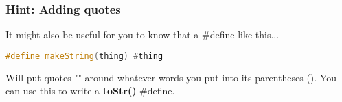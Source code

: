 \documentclass[a4paper,12pt]{article} %
\begin{document}
\subsubsection{Hint: Adding quotes}

\noindent
It might also be useful for you to know that a \#define like this...

\vspace{5mm}
\begin{lstlisting}[language=C++]
#define makeString(thing) #thing
\end{lstlisting}

\noindent
Will put quotes "" around whatever words you put into its parentheses (). You can use this to write a \textbf{toStr()} \#define.
\end{document}
